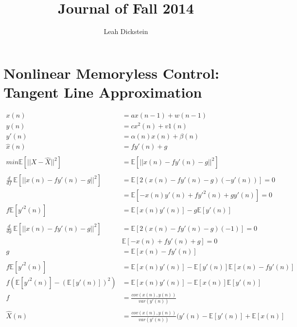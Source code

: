 \documentclass[leqno,twocolumn]{article}
\begin{document}
\onecolumn
\title{Journal of Fall 2014}
\author{Leah Dickstein}

\maketitle

\tableofcontents

\section{Nonlinear Memoryless Control: Tangent Line Approximation}

\begin{align*}
x(n) &= ax(n-1) + w(n-1)\\
y(n) &= cx^2(n) + v1(n)\\
y'(n) &= \alpha(n) x(n) + \beta(n) \\
\hat{x}(n) &= fy'(n) + g\\
{} \\
min \mathbb{E}[||X - \hat{X}||^2] &= \mathbb{E}[||x(n) - fy'(n) - g||^2]\\
{} \\
\frac{d}{df} \: \mathbb{E}[||x(n) - fy'(n) - g||^2] &= \mathbb{E}[2(x(n) - fy'(n) - g)(-y'(n))] = 0\\
&= \mathbb{E}[-x(n)y'(n) + fy'^2(n) + gy'(n)] = 0\\
f\mathbb{E}[y'^2(n)] &= \mathbb{E}[x(n)y'(n)] - g\mathbb{E}[y'(n)]\\
{} \\
\frac{d}{dg} \: \mathbb{E}[||x(n) - fy'(n) - g||^2] &= \mathbb{E}[2(x(n) - fy'(n) - g)(-1)] = 0\\
& \mathbb{E}[-x(n) + fy'(n) + g] = 0\\
g &= \mathbb{E}[x(n) - fy'(n)]\\
{} \\
f \mathbb{E}[y'^2(n)] &= \mathbb{E}[x(n)y'(n)] - \mathbb{E}[y'(n)] \mathbb{E}[x(n) - fy'(n)] \\
f (\mathbb{E}[y'^2(n)] - (\mathbb{E}[y'(n)])^2 ) &= \mathbb{E}[x(n)y'(n)] - \mathbb{E}[x(n)] \mathbb{E}[y'(n)] \\
f &= \frac{cov(x(n), y(n) )}{var(y'(n))}\\
{} \\
\hat{X}(n) &= \frac{cov(x(n), y(n) )}{var(y'(n))} (y'(n) - \mathbb{E}[y'(n)] + \mathbb{E}[x(n)]
\end{align*}
\end{document}
